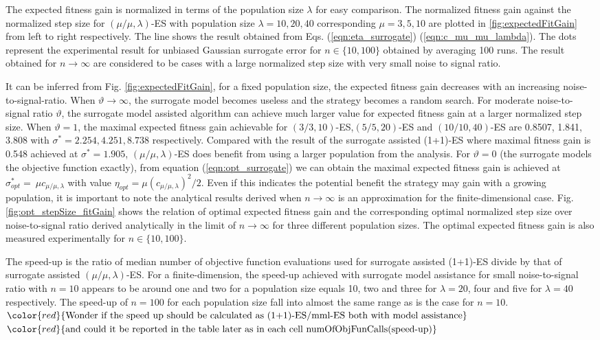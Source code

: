 The expected fitness gain is normalized in terms of the population size $\lambda$ for easy comparison. The normalized fitness gain against the normalized step size for $(\mu/\mu,\lambda)$-ES with population size $\lambda=10,20,40$ corresponding $\mu=3,5,10$ are plotted in \ref{fig:expectedFitGain} from left to right respectively. The line shows the result obtained from Eqs. (\ref{eqn:eta_surrogate}) (\ref{eqn:c_mu_mu_lambda}). The dots represent the experimental result for unbiased Gaussian surrogate error for $n \in \{10,100 \}$ obtained by averaging 100 runs. The result obtained for $n \rightarrow \infty$ are considered to be cases with a large normalized step size with very small noise to signal ratio. 

It can be inferred from Fig. \ref{fig:expectedFitGain}, for a fixed population size, the expected fitness gain decreases with an increasing noise-to-signal-ratio. When $\vartheta \rightarrow \infty$, the surrogate model becomes useless and the strategy becomes a random search. For moderate noise-to-signal ratio $\vartheta$, the surrogate model assisted algorithm can achieve much larger value for expected fitness gain at a larger normalized step size. When $\vartheta = 1$, the maximal expected fitness gain achievable for $(3/3,10)$-ES,$(5/5,20)$-ES and $(10/10,40)$-ES are 0.8507, 1.841, 3.808 with $\sigma^*=2.254,4.251,8.738$ respectively. Compared with the result of the surrogate assisted (1+1)-ES \cite{DBLP:conf/ppsn/KayhaniA18} where maximal fitness gain is 0.548 achieved at $\sigma^* = 1.905$, $(\mu/\mu,\lambda)$-ES does benefit from using a larger population from the analysis. For $\vartheta=0$ (the surrogate models the objective function exactly), from equation (\ref{eqn:opt_surrogate}) we can obtain the maximal expected fitness gain is achieved at $\sigma^*_{opt} = \ \mu c_{\mu / \mu, \lambda}$ with value $\eta_{opt} =  \mu (c_{\mu / \mu, \lambda})^2/2$. Even if this indicates the potential benefit the strategy may gain with a growing population, it is important to note the analytical results derived when $n \rightarrow \infty$ is an approximation for the finite-dimensional case. Fig. \ref{fig:opt_stepSize_fitGain} shows the relation of optimal expected fitness gain and the corresponding optimal normalized step size over noise-to-signal ratio derived analytically in the limit of $n \rightarrow \infty$ for three different population sizes. The optimal expected fitness gain is also measured experimentally for $n \in \{10,100 \}$. 

The speed-up is the ratio of median number of objective function evaluations used for surrogate assisted (1+1)-ES divide by that of surrogate assisted $(\mu/\mu,\lambda)$-ES. For a finite-dimension, the speed-up achieved with surrogate model assistance for small noise-to-signal ratio with $n=10$ appears to be around one and two for a population size equals 10, two and three for $\lambda = 20$, four and five for $\lambda=40$ respectively. The speed-up of $n=100$ for each population size fall into almost the same range as is the case for $n=10$.  
$\color{red}{\text{Wonder if the speed up should be calculated as (1+1)-ES/mml-ES both with model assistance}}$ $ \color{red}{\text{and could it be reported in the table later as in each cell numOfObjFunCalls(speed-up)}}$

